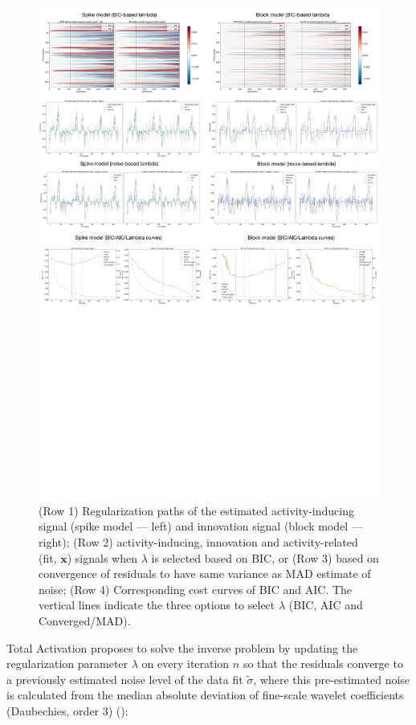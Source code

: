 \begin{figure}[t!]
    \begin{center}
        \includegraphics[width=\textwidth]{figures/exp.pdf}
    \end{center}
    \caption{(Row 1) Regularization paths of the estimated activity-inducing signal (spike model --- left) and innovation signal (block model --- right); (Row 2) activity-inducing, innovation and activity-related (fit, \(\mathbf{x}\)) signals when \(\lambda\) is selected based on BIC, or (Row 3) based on convergence of residuals to have same variance as MAD estimate of noise; (Row 4) Corresponding cost curves of BIC and AIC. The vertical lines indicate the three options to select \(\lambda\) (BIC, AIC and Converged/MAD).}
\label{fig:exp}
\end{figure}

Total Activation proposes to solve the inverse problem by updating the regularization parameter \(\lambda\) on every iteration \(n\) so that the residuals converge to a previously estimated noise level of the data fit \(\tilde{\sigma}\), where this pre-estimated noise is calculated from the median absolute deviation of fine-scale wavelet coefficients (Daubechies, order 3) (\citealt{karahanoglu2013TotalActivationFMRI}):

